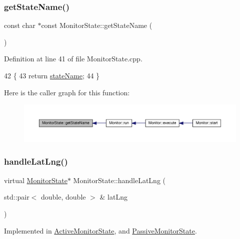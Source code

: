 \subsubsection{\texorpdfstring{get\+State\+Name()}{getStateName()}}
{\footnotesize\ttfamily const char $\ast$const Monitor\+State\+::get\+State\+Name (\begin{DoxyParamCaption}{ }\end{DoxyParamCaption})}



Definition at line 41 of file Monitor\+State.\+cpp.


\begin{DoxyCode}
42 \{
43     \textcolor{keywordflow}{return} \hyperlink{class_monitor_state_aaeef0ae307bb9cfcbb4fcb08c115fb0f}{stateName};
44 \}
\end{DoxyCode}
Here is the caller graph for this function\+:\nopagebreak
\begin{figure}[H]
\begin{center}
\leavevmode
\includegraphics[width=350pt]{dd/d45/class_monitor_state_acb6d3a4de174058cb5b167fc04929ddb_icgraph}
\end{center}
\end{figure}
\mbox{\label{class_monitor_state_a8c8b871e3e8308e11f35905dd8741878}} 
\subsubsection{\texorpdfstring{handle\+Lat\+Lng()}{handleLatLng()}}
{\footnotesize\ttfamily virtual \hyperlink{class_monitor_state}{Monitor\+State}$\ast$ Monitor\+State\+::handle\+Lat\+Lng (\begin{DoxyParamCaption}\item[{std\+::pair$<$ double, double $>$ \&}]{lat\+Lng }\end{DoxyParamCaption})\hspace{0.3cm}{\ttfamily [pure virtual]}}



Implemented in \hyperlink{class_active_monitor_state_a0eb7622ad3aa4d372d90589838cb50a9}{Active\+Monitor\+State}, and \hyperlink{class_passive_monitor_state_a173a7c8a4d0b8ecea5928e0c90dec26b}{Passive\+Monitor\+State}.

